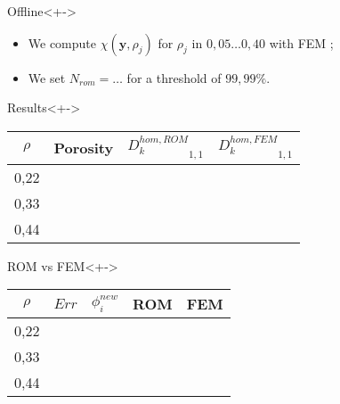 \begin{frame}%
%
\begin{block}{Offline}<+->
\begin{itemize}
\item<+-> We compute $\chi(\mathbf{y},\rho_j)$ for $\rho_j$ in $0,05 \dots 0,40$ with FEM ;
\item<+-> We set $N_{rom}=\dots$ for a threshold of $99,99\%$.
\end{itemize}
\end{block}
%
\begin{block}{Results}<+->
%
\begin{center}
\begin{tabular}{|c|c||c|c||}%
\hline
$\rho$&Porosity&${D_k^{hom,ROM}}_{1,1}$&${D_k^{hom,FEM}}_{1,1}$\\%
\hline
0,22&&&\\%
\hline
0,33&&&\\%
\hline
0,44&&&\\%
\hline
\end{tabular}
\end{center}
%
\end{block}
%
\begin{block}{ROM vs FEM}<+->
%
\begin{center}
\begin{tabular}{|c|c||c|c||c|}%
\hline
$\rho$&$Err$&$\phi_i^{new}$&ROM&FEM\\
\hline
0,22&&&&\\
\hline
0,33&&&&\\
\hline
0,44&&&&\\
\hline
\end{tabular}
\end{center}
%
\end{block}
%
\end{frame}